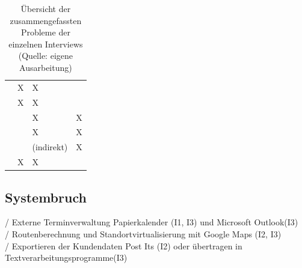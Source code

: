 \documentclass[Bachelorarbeit.tex]{subfiles}
\begin{document}
\def\arraystretch{1.5} %
\begin{table}[h!]
	\begin{tabular}{|p{5cm}|p{}|p{}|p{}|}
		\hline  
		& \ctab \nameref{anhang:interview1} 
		& \ctab \nameref{anhang:interview2} 
		& \ctab \nameref{anhang:interview3} \\ 
		\hline 
		\nameref{p1}
		& \ctab X
		& \ctab X
		& \ctab  \\ 
		\hline 
		\nameref{p2}
		& \ctab  X
		& \ctab X
		& \ctab  \\ 
		
		\hline 
		\nameref{p3}
		& \ctab  
		& \ctab X
		& \ctab X \\ 
		\hline 
		\nameref{p4}
		& \ctab 
		& \ctab  X
		& \ctab X \\ 
		\hline 
		\nameref{p5}
		& \ctab 
		& \ctab (indirekt)
		& \ctab X \\ 
		\hline 
		\nameref{p6}
		& \ctab X
		& \ctab X
		& \ctab  \\ 
		\hline 
	
	\end{tabular} 
	\caption[Zusammenfassung der Probleme]{Übersicht der zusammengefassten Probleme der einzelnen Interviews (Quelle: eigene Ausarbeitung)}
	\label{tab:problemeInterviews}
\end{table}


\subsection*{Systembruch}
\label{p1}

/ Externe Terminverwaltung Papierkalender (I1, I3) und Microsoft Outlook(I3)\\
/ Routenberechnung und Standortvirtualisierung mit Google Maps (I2, I3)\\
/ Exportieren der Kundendaten Post Its (I2) oder übertragen in Textverarbeitungsprogramme(I3)\\

\end{document}
